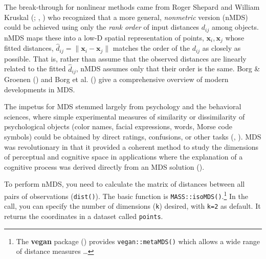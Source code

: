 \documentclass[
  letterpaper,
  10pt,
  krantz2]{krantz}
\begin{document}
The break-through for nonlinear methods came from Roger Shepard and
William Kruskal (;
,
) who recognized that a more general,
\emph{nonmetric} version (nMDS) could be achieved using only the
\emph{rank order} of input distances \(d_{ij}\) among objects. nMDS maps
these into a low-D spatial representation of points,
\(\mathbf{x}_i, \mathbf{x}_j\) whose fitted distances,
\(\hat{d}_{ij} = \lVert\mathbf{x}_i - \mathbf{x}_j\rVert\) matches the
order of the \(d_{ij}\) as closely as possible. That is, rather than
assume that the observed distances are linearly related to the fitted
\(\hat{d}_{ij}\), nMDS assumes only that their order is the same. Borg
\& Groenen () and Borg et al.
() give a comprehensive overview of modern
developments in MDS.

The impetus for MDS stemmed largely from psychology and the behavioral
sciences, where simple experimental measures of similarity or
dissimilarity of psychological objects (color names, facial expressions,
words, Morse code symbols) could be obtained by direct ratings,
confusions, or other tasks (, ). MDS was
revolutionary in that it provided a coherent method to study the
dimensions of perceptual and cognitive space in applications where the
explanation of a cognitive process was derived directly from an MDS
solution ().

To perform nMDS, you need to calculate the matrix of distances between
all pairs of observations (\texttt{dist()}). The basic function is
\texttt{MASS::isoMDS()}.\footnote{The \textbf{vegan} package
  () provides
  \texttt{vegan::metaMDS()} which allows a wide range of distance
  measures \ldots{}} In the call, you can specify the number of
dimensions (\texttt{k}) desired, with \texttt{k=2} as default. It
returns the coordinates in a dataset called \texttt{points}.
\end{document}
